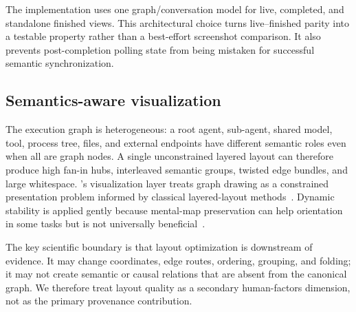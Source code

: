 The implementation uses one graph/conversation model for live, completed, and standalone finished views. This architectural choice turns live--finished parity into a testable property rather than a best-effort screenshot comparison. It also prevents post-completion polling state from being mistaken for successful semantic synchronization.

\subsection{Semantics-aware visualization}
The execution graph is heterogeneous: a root agent, sub-agent, shared model, tool, process tree, files, and external endpoints have different semantic roles even when all are graph nodes. A single unconstrained layered layout can therefore produce high fan-in hubs, interleaved semantic groups, twisted edge bundles, and large whitespace. \system's visualization layer treats graph drawing as a constrained presentation problem informed by classical layered-layout methods~\cite{sugiyama1981hierarchical,gansner1993directed,brandes2002horizontal}. Dynamic stability is applied gently because mental-map preservation can help orientation in some tasks but is not universally beneficial~\cite{archambault2011dynamic,archambault2013mentalmap}.

The key scientific boundary is that layout optimization is downstream of evidence. It may change coordinates, edge routes, ordering, grouping, and folding; it may not create semantic or causal relations that are absent from the canonical graph. We therefore treat layout quality as a secondary human-factors dimension, not as the primary provenance contribution.
